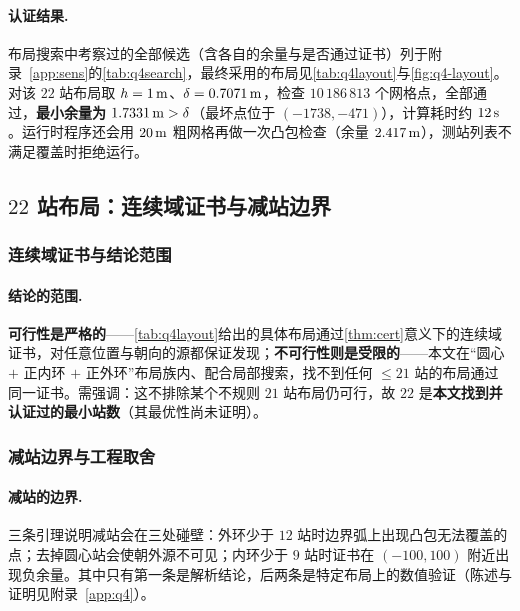 \paragraph{认证结果.} 布局搜索中考察过的全部候选（含各自的余量与是否通过证书）列于附录~\ref{app:sens}的\cref{tab:q4search}，最终采用的布局见\cref{tab:q4layout}与\cref{fig:q4-layout}。对该 $22$ 站布局取 $h=1\,\mathrm{m}$、$\delta=0.7071\,\mathrm{m}$，检查 $10\,186\,813$ 个网格点，全部通过，\textbf{最小余量为 $1.7331\,\mathrm{m}>\delta$}（最坏点位于 $(-1738,-471)$），计算耗时约 $12\,\mathrm{s}$。运行时程序还会用 $20\,\mathrm{m}$ 粗网格再做一次凸包检查（余量 $2.417\,\mathrm{m}$），测站列表不满足覆盖时拒绝运行。

\subsection{$22$ 站布局：连续域证书与减站边界}\label{sec:q4:lower}

\subsubsection{连续域证书与结论范围}

\paragraph{结论的范围.} \textbf{可行性是严格的}——\cref{tab:q4layout}给出的具体布局通过\cref{thm:cert}意义下的连续域证书，对任意位置与朝向的源都保证发现；\textbf{不可行性则是受限的}——本文在“圆心 $+$ 正内环 $+$ 正外环”布局族内、配合局部搜索，找不到任何 $\le21$ 站的布局通过同一证书。需强调：这不排除某个不规则 $21$ 站布局仍可行，故 $22$ 是\textbf{本文找到并认证过的最小站数}（其最优性尚未证明）。

\subsubsection{减站边界与工程取舍}

\paragraph{减站的边界.} 三条引理说明减站会在三处碰壁：外环少于 $12$ 站时边界弧上出现凸包无法覆盖的点；去掉圆心站会使朝外源不可见；内环少于 $9$ 站时证书在 $(-100,100)$ 附近出现负余量。其中只有第一条是解析结论，后两条是特定布局上的数值验证（陈述与证明见附录~\ref{app:q4}）。

